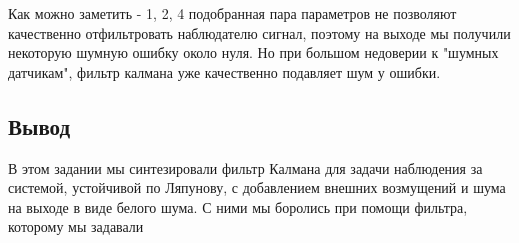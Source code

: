 Как можно заметить - 1, 2, 4 подобранная пара параметров не позволяют качественно отфильтровать наблюдателю сигнал, 
поэтому на выходе мы получили некоторую шумную ошибку около нуля. Но при большом недоверии к "шумных датчикам", фильтр калмана уже качественно подавляет шум у ошибки.

\subsection{Вывод}
В этом задании мы синтезировали фильтр Калмана для задачи наблюдения за системой, устойчивой по Ляпунову, с добавлением внешних возмущений и шума на выходе в виде белого шума.
С ними мы боролись при помощи фильтра, которому мы задавали
\endinput 